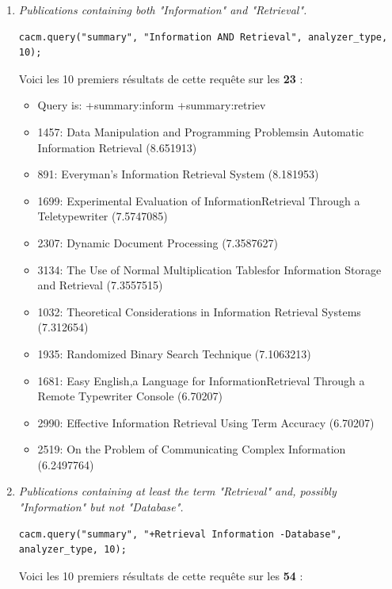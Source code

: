 \begin{enumerate}
\item \textit{Publications containing both "Information" and "Retrieval".}

\begin{lstlisting}
cacm.query("summary", "Information AND Retrieval", analyzer_type, 10);
\end{lstlisting}

Voici les 10 premiers résultats de cette requête sur les \textbf{23} :

\begin{itemize}
    \item Query is: +summary:inform +summary:retriev
    \item 1457: Data Manipulation and Programming Problemsin Automatic Information Retrieval (8.651913)
    \item 891: Everyman's Information Retrieval System (8.181953)
    \item 1699: Experimental Evaluation of InformationRetrieval Through a Teletypewriter (7.5747085)
    \item 2307: Dynamic Document Processing (7.3587627)
    \item 3134: The Use of Normal Multiplication Tablesfor Information Storage and Retrieval (7.3557515)
    \item 1032: Theoretical Considerations in Information Retrieval Systems (7.312654)
    \item 1935: Randomized Binary Search Technique (7.1063213)
    \item 1681: Easy English,a Language for InformationRetrieval Through a Remote Typewriter Console (6.70207)
    \item 2990: Effective Information Retrieval Using Term Accuracy (6.70207)
    \item 2519: On the Problem of Communicating Complex Information (6.2497764)
\end{itemize}

\item \textit{Publications containing at least the term "Retrieval" and, possibly "Information" but not "Database".}

\begin{lstlisting}
cacm.query("summary", "+Retrieval Information -Database", analyzer_type, 10);
\end{lstlisting}

Voici les 10 premiers résultats de cette requête sur les \textbf{54} :


\end{enumerate}

